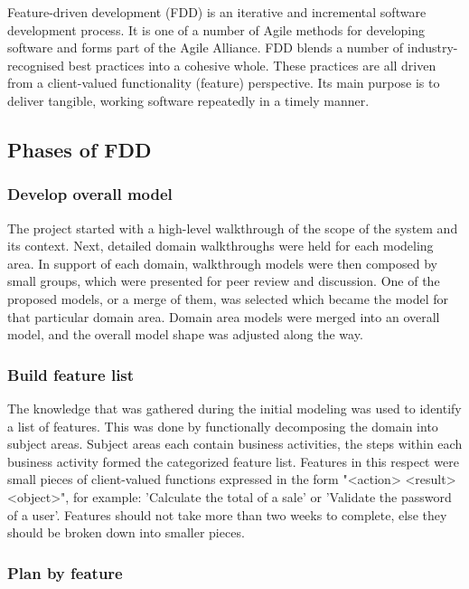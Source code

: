 Feature-driven development (FDD) is an iterative and incremental software development process. It is one of a number of Agile methods for developing software and forms part of the Agile Alliance. FDD blends a number of industry-recognised best practices into a cohesive whole. These practices are all driven from a client-valued functionality (feature) perspective. Its main purpose is to deliver tangible, working software repeatedly in a timely manner.

\subsection{Phases of FDD}

\subsubsection{Develop overall model}
The project started with a high-level walkthrough of the scope of the system and its context. Next, detailed domain walkthroughs were held for each modeling area. In support of each domain, walkthrough models were then composed by small groups, which were presented for peer review and discussion. One of the proposed models, or a merge of them, was selected which became the model for that particular domain area. Domain area models were merged into an overall model, and the overall model shape was adjusted along the way.

\subsubsection{Build feature list}

The knowledge that was gathered during the initial modeling was used to identify a list of features. This was done by functionally decomposing the domain into subject areas. Subject areas each contain business activities, the steps within each business activity formed the categorized feature list. Features in this respect were small pieces of client-valued functions expressed in the form "<action> <result> <object>", for example: 'Calculate the total of a sale' or 'Validate the password of a user'. Features should not take more than two weeks to complete, else they should be broken down into smaller pieces.

\subsubsection{Plan by feature}


